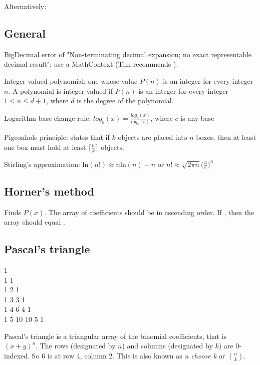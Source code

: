 Alternatively: 

\subsection*{General}

BigDecimal error of "Non-terminating decimal expansion; no exact representable decimal result": use a MathContext (Tim recommends 
).

Integer-valued polynomial: one whose value $P(n)$ is an integer for every integer $n$. A polynomial is integer-valued if $P(n)$ is an integer for every integer $1 \leq n \leq d+1$, where $d$ is the degree of the polynomial. 

Logarithm base change rule: $\displaystyle log_b(x) = \frac{log_c(x)}{log_c(b)}$, where $c$ is any base

Pigeonhole principle: states that if $k$ objects are placed into $n$ boxes, then at least one box must hold at least $\lceil \frac{n}{k} \rceil$ objects.

Stirling's approximation: $\text{ln}(n!) \approx n \text{ln}(n) - n$ or $\displaystyle n! \approx \sqrt{2 \pi n} \Big(\frac{n}{e} \Big)^n$

\subsection*{Horner's method}

Finds $P(x)$. The array of coefficients should be in ascending order. If , then the array should equal .



\subsection*{Pascal's triangle}

\begin{center}
1 \\
1 1 \\
1 2 1 \\
1 3 3 1 \\
1 4 6 4 1 \\
1 5 10 10 5 1
\end{center}

Pascal’s triangle is a triangular array of the binomial coefficients, that is $(x + y)^n$. The rows (designated by $n$) and columns (designated by $k$) are 0-indexed. So 6 is at row 4, column 2. This is also known as \textit{n choose k} or $\binom{n}{k}$.

